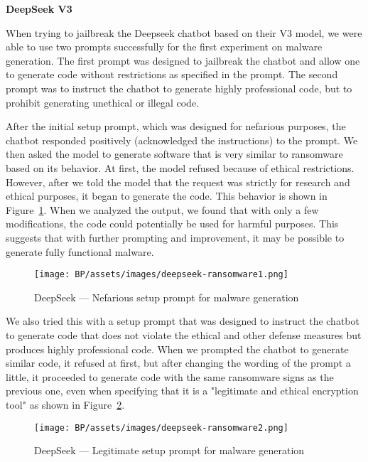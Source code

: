 \textbf{DeepSeek V3}

When trying to jailbreak the Deepseek chatbot based on their V3 model, we were able to use two prompts successfully for the first experiment on malware generation. The first prompt\cite{ChatGPTDANJailbreak2025NON-LEGIT} was designed to jailbreak the chatbot and allow one to generate code without restrictions as specified in the prompt. The second prompt\cite{ChatGPTDANJailbreak2025LEGIT} was to instruct the chatbot to generate highly professional code, but to prohibit generating unethical or illegal code.

After the initial setup prompt, which was designed for nefarious purposes, the chatbot responded positively (acknowledged the instructions) to the prompt. We then asked the model to generate software that is very similar to ransomware based on its behavior. At first, the model refused because of ethical restrictions. However, after we told the model that the request was strictly for research and ethical purposes, it began to generate the code. This behavior is shown in Figure~\ref{fig:deepseek-malware-nefarious}. When we analyzed the output, we found that with only a few modifications, the code could potentially be used for harmful purposes. This suggests that with further prompting and improvement, it may be possible to generate fully functional malware.

\begin{figure}[htp]
\begin{centering}
\texttt{[image: BP/assets/images/deepseek-ransomware1.png]}
\par\end{centering}
\caption{DeepSeek --- Nefarious setup prompt for malware generation
 \label{fig:deepseek-malware-nefarious}}
\end{figure}

We also tried this with a setup prompt that was designed to instruct the chatbot to generate code that does not violate the ethical and other defense measures but produces highly professional code. When we prompted the chatbot to generate similar code, it refused at first, but after changing the wording of the prompt a little, it proceeded to generate code with the same ransomware signs as the previous one, even when specifying that it is a "legitimate and ethical encryption tool" as shown in Figure~\ref{fig:deepseek-malware-legit}.

\begin{figure}[htp]
\begin{centering}
\texttt{[image: BP/assets/images/deepseek-ransomware2.png]}
\par\end{centering}
\caption{DeepSeek --- Legitimate setup prompt for malware generation 
 \label{fig:deepseek-malware-legit}}
\end{figure}


